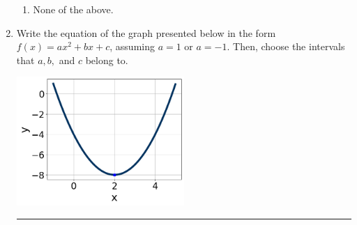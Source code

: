 \documentclass[14pt]{extbook}
\newcommand{\litem}[1]{\item#1\hspace*{-1cm}\rule{\textwidth}{0.4pt}}
\begin{document}
\begin{enumerate}
{\begin{enumerate}[label=\Alph*.]
\item None of the above.
\end{enumerate} }
\litem{
Write the equation of the graph presented below in the form $f(x)=ax^2+bx+c$, assuming  $a=1$ or $a=-1$. Then, choose the intervals that $a, b,$ and $c$ belong to.
\begin{center}
    \includegraphics[width=0.5\textwidth]{../Figures/quadraticGraphToEquationB.png}

\end{center}}
\end{enumerate}
\end{document}
